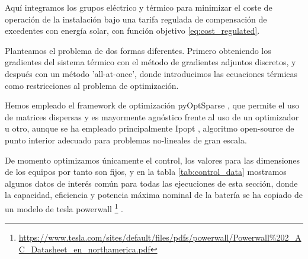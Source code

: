 Aquí integramos los grupos eléctrico y térmico para minimizar el coste de
operación de la instalación bajo una tarifa regulada de compensación de
excedentes con energía solar, con función objetivo \eqref{eq:cost_regulated}.

Planteamos el problema de dos formas diferentes. Primero obteniendo los
gradientes del sistema térmico con el método de gradientes adjuntos discretos,
y después con un método 'all-at-once', donde introducimos las ecuaciones
térmicas como restricciones al problema de optimización.

Hemos empleado el framework de optimización pyOptSparse \cite{Wu2020}, que
permite el uso de matrices dispersas y es mayormente agnóstico frente al uso de
un optimizador u otro, aunque se ha empleado principalmente Ipopt
\cite{wachter2006implementation}, algoritmo open-source de punto interior
adecuado para problemas no-lineales de gran escala.

De momento optimizamos únicamente el control, los valores para las dimensiones
de los equipos por tanto son fijos, y en la tabla \ref{tab:control_data}
mostramos algunos datos de interés común para todas las ejecuciones de esta
sección, donde la capacidad, eficiencia y potencia máxima nominal de la batería
se ha copiado de un modelo de tesla powerwall
\footnote{\url{https://www.tesla.com/sites/default/files/pdfs/powerwall/Powerwall\%202\_AC\_Datasheet\_en\_northamerica.pdf}}
.

